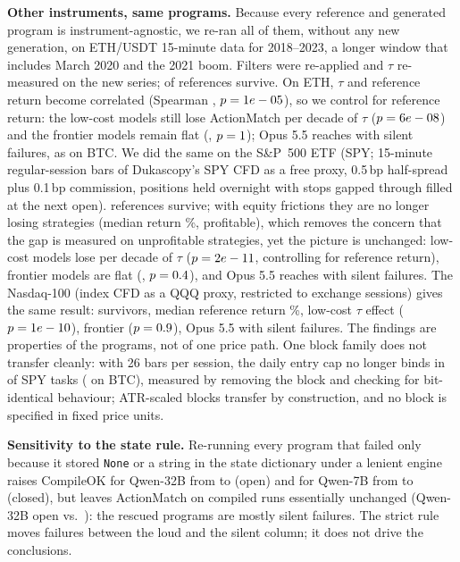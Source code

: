 \documentclass[sigconf,nonacm]{acmart}
\begin{document}
\textbf{Other instruments, same programs.} Because every reference and generated program is
instrument-agnostic, we re-ran all of them, without any new generation, on ETH/USDT 15-minute data
for 2018--2023, a longer window that includes March 2020 and the 2021 boom. Filters were re-applied and
$\tau$ re-measured on the new series; \MAEthSurvive{} of \NTasks{} references survive. On ETH, $\tau$
and reference return become correlated (Spearman \MAEthRho, $p=1e-05$), so we control for
reference return: the low-cost models still lose \MAEthLowTau{} ActionMatch per decade of $\tau$
($p=6e-08$) and the frontier models remain flat (\MAEthFrontTau, $p=1$); Opus
5.5 reaches \MAEthAMOpus{} with \MAEthSilentOpus{} silent failures, as on BTC. We did the same on
the S\&P~500 ETF (SPY; 15-minute regular-session bars of Dukascopy's SPY CFD as a free proxy, 0.5\,bp
half-spread plus 0.1\,bp commission, positions held overnight with stops gapped through filled at the
next open). \MASpySurvive{} references survive; with equity frictions they are no longer losing
strategies (median return \MASpyRMed\%, \MASpyProfitable{} profitable), which removes the concern that
the gap is measured on unprofitable strategies, yet the picture is unchanged: low-cost models lose
\MASpyLowTau{} per decade of $\tau$ ($p=2e-11$, controlling for reference return), frontier
models are flat (\MASpyFrontTau, $p=0.4$), and Opus 5.5 reaches \MASpyAMOpus{} with
\MASpySilentOpus{} silent failures. The Nasdaq-100 (index CFD as a QQQ proxy, restricted to exchange sessions) gives
the same result: \MANdxSurvive{} survivors, median reference return \MANdxRMed\%, low-cost $\tau$
effect \MANdxLowTau{} ($p=1e-10$), frontier \MANdxFrontTau{} ($p=0.9$), Opus 5.5
\MANdxAMOpus{} with \MANdxSilentOpus{} silent failures. The findings are properties of the programs, not of one price
path. One block family does not transfer cleanly: with 26 bars per session, the daily entry cap no
longer binds in \MASpyInertDailyCap{} of SPY tasks (\MABtcInertDailyCap{} on BTC), measured by
removing the block and checking for bit-identical behaviour; ATR-scaled blocks transfer by
construction, and no block is specified in fixed price units.

\textbf{Sensitivity to the state rule.} Re-running every program that failed only because it stored
\texttt{None} or a string in the state dictionary under a lenient engine raises CompileOK for
Qwen-32B from \CompileOKQwenLOpen{} to \CompileLenientQwenLOpen{} (open) and for Qwen-7B from
\CompileOKQwenSClosed{} to \CompileLenientQwenSClosed{} (closed), but leaves ActionMatch on compiled
runs essentially unchanged (Qwen-32B open \ActionMatchQwenLOpen{} vs.\ \AMLenientQwenLOpen): the
rescued programs are mostly silent failures. The strict rule moves failures between the loud and
the silent column; it does not drive the conclusions.
\end{document}
